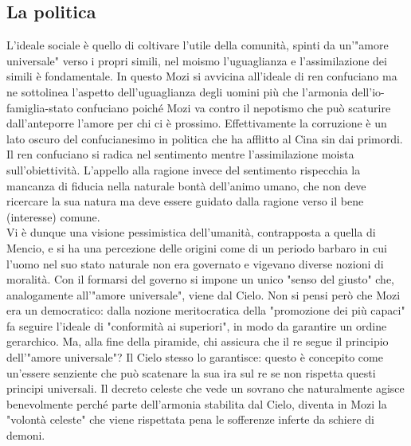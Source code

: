 \documentclass[10pt,a4paper]{report}
\begin{document}
\subsection{La politica}
L'ideale sociale è quello di coltivare l'utile della comunità, spinti da un'"amore universale" verso i propri simili, nel moismo l'uguaglianza e l'assimilazione dei simili è fondamentale. In questo Mozi si avvicina all'ideale di ren confuciano ma ne sottolinea l'aspetto dell'uguaglianza degli uomini più che l'armonia dell'io-famiglia-stato confuciano poiché Mozi va contro il nepotismo che può scaturire dall'anteporre l'amore per chi ci è prossimo. Effettivamente la corruzione è un lato oscuro del confucianesimo in politica che ha afflitto al Cina sin dai primordi. Il ren confuciano si radica nel sentimento mentre l'assimilazione moista sull'obiettività. L'appello alla ragione invece del sentimento rispecchia la mancanza di fiducia nella naturale bontà dell'animo umano, che non deve ricercare la sua natura ma deve essere guidato dalla ragione verso il bene (interesse) comune.\\
Vi è dunque una visione pessimistica dell'umanità, contrapposta a quella di Mencio, e si ha una percezione delle origini come di un periodo barbaro in cui l'uomo nel suo stato naturale non era governato e vigevano diverse nozioni di moralità. Con il formarsi del governo si impone un unico "senso del giusto" che, analogamente all'"amore universale", viene dal Cielo. Non si pensi però che Mozi era un democratico: dalla nozione meritocratica della "promozione dei più capaci"  fa seguire l'ideale di "conformità ai superiori", in modo da garantire un ordine gerarchico. Ma, alla fine della piramide, chi assicura che il re segue il principio dell'"amore universale"? Il Cielo stesso lo garantisce: questo è concepito come un'essere senziente che può scatenare la sua ira sul re se non rispetta questi principi universali. Il decreto celeste che vede un sovrano che naturalmente agisce benevolmente perché parte dell'armonia stabilita dal Cielo, diventa in Mozi la "volontà celeste" che viene rispettata pena le sofferenze inferte da schiere di demoni.
\end{document}
